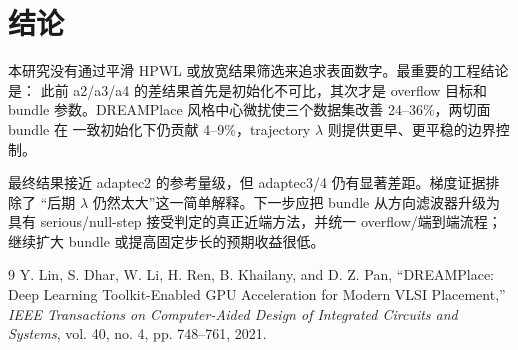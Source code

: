 \documentclass[UTF8,fontset=windows,a4paper,11pt]{ctexart}
\begin{document}
\section{结论}

本研究没有通过平滑 HPWL 或放宽结果筛选来追求表面数字。最重要的工程结论是：
此前 a2/a3/a4 的差结果首先是初始化不可比，其次才是 overflow 目标和 bundle
参数。DREAMPlace 风格中心微扰使三个数据集改善 24--36\%，两切面 bundle 在
一致初始化下仍贡献 4--9\%，trajectory $\lambda$ 则提供更早、更平稳的边界控制。

最终结果接近 adaptec2 的参考量级，但 adaptec3/4 仍有显著差距。梯度证据排除了
“后期 $\lambda$ 仍然太大”这一简单解释。下一步应把 bundle 从方向滤波器升级为
具有 serious/null-step 接受判定的真正近端方法，并统一 overflow/端到端流程；
继续扩大 bundle 或提高固定步长的预期收益很低。

\begin{thebibliography}{9}
Y. Lin, S. Dhar, W. Li, H. Ren, B. Khailany, and D. Z. Pan,
``DREAMPlace: Deep Learning Toolkit-Enabled GPU Acceleration for Modern VLSI
Placement,'' \emph{IEEE Transactions on Computer-Aided Design of Integrated
Circuits and Systems}, vol. 40, no. 4, pp. 748--761, 2021.
\end{thebibliography}
\end{document}

